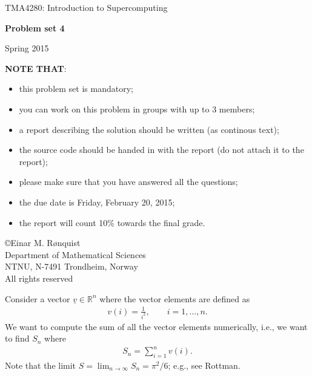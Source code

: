 \documentclass[11pt]{article}
\begin{document}
 
\LARGE
\begin{center}
TMA4280: Introduction to Supercomputing
\end{center}
\vspace{1in}

\begin{center}
{\bf Problem set 4}
\end{center}

\Large
\vspace{0.5in}
\begin{center}
Spring 2015
\end{center}

\vspace{0.5in}

{\bf NOTE THAT}:
\begin{itemize}
  \item this problem set is mandatory;
  \item you can work on this problem in groups with up to 3 members;
  \item a report describing the solution should be written (as continous text);
  \item the source code should be handed in with the report (do not attach it to the report);
  \item please make sure that you have answered all the questions; 
  \item the due date is Friday, February 20, 2015;
  \item the report will count 10\% towards the final grade.
\end{itemize}

\vspace{0.5in}

\begin{center}
\copyright Einar M. R{\o}nquist \\
Department of Mathematical Sciences\\
NTNU, N-7491 Trondheim, Norway\\
All rights reserved
\end{center}

\large

\newpage

\noindent 
Consider a vector $\underline{v} \in \mathbb{R}^n$ where the vector elements are defined as
\begin{align}
  v(i) = \frac{1}{i^2}, \qquad i=1,\ldots, n. 
\end{align}
We want to compute the sum of all the vector elements numerically, i.e., 
we want to find $S_n$ where
\begin{align}
  S_n = \sum_{i=1}^n v(i).
\end{align}
Note that the limit $S = \lim_{n\rightarrow\infty} S_n = \pi^2/6$; e.g., see Rottman.
\vspace{1cm}
\end{document}
